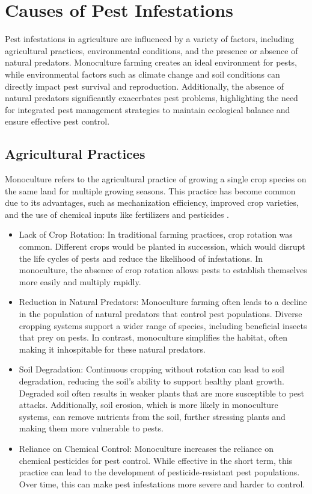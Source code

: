 \section{Causes of Pest Infestations}
Pest infestations in agriculture are influenced by a variety of factors, including agricultural practices, environmental conditions, and the presence or absence of natural predators. Monoculture farming creates an ideal environment for pests, while environmental factors such as climate change and soil conditions can directly impact pest survival and reproduction. Additionally, the absence of natural predators significantly exacerbates pest problems, highlighting the need for integrated pest management strategies to maintain ecological balance and ensure effective pest control.


\subsection{Agricultural Practices} 
Monoculture refers to the agricultural practice of growing a single crop species on the same land for multiple growing seasons. This practice has become common due to its advantages, such as mechanization efficiency, improved crop varieties, and the use of chemical inputs like fertilizers and pesticides \cite{power_1987_monoculture}.
    \begin{itemize}
    \item Lack of Crop Rotation: In traditional farming practices, crop rotation was common. Different crops would be planted in succession, which would disrupt the life cycles of pests and reduce the likelihood of infestations. In monoculture, the absence of crop rotation allows pests to establish themselves more easily and multiply rapidly.
    \item Reduction in Natural Predators: Monoculture farming often leads to a decline in the population of natural predators that control pest populations. Diverse cropping systems support a wider range of species, including beneficial insects that prey on pests. In contrast, monoculture simplifies the habitat, often making it inhospitable for these natural predators.
    \item Soil Degradation: Continuous cropping without rotation can lead to soil degradation, reducing the soil's ability to support healthy plant growth. Degraded soil often results in weaker plants that are more susceptible to pest attacks. Additionally, soil erosion, which is more likely in monoculture systems, can remove nutrients from the soil, further stressing plants and making them more vulnerable to pests.
    \item Reliance on Chemical Control: Monoculture increases the reliance on chemical pesticides for pest control. While effective in the short term, this practice can lead to the development of pesticide-resistant pest populations. Over time, this can make pest infestations more severe and harder to control.
    \end{itemize}
